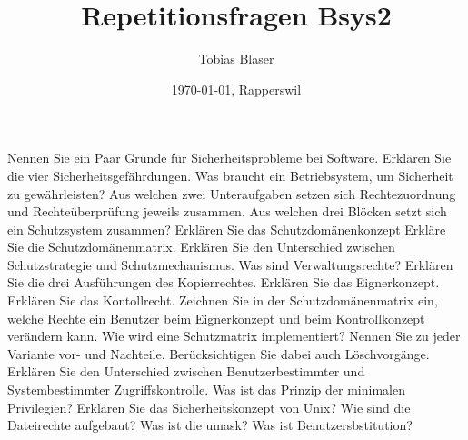 \documentclass[ngerman,a4paper,12pt]{scrreprt}
\title{Repetitionsfragen Bsys2}
\author{Tobias Blaser}
\date{\today{}, Rapperswil}
\begin{document}
\tableofcontents
\clearpage

\ol
	\li Nennen Sie ein Paar Gründe für Sicherheitsprobleme bei Software.
	\li Erklären Sie die vier Sicherheitsgefährdungen.
	\li Was braucht ein Betriebsystem, um Sicherheit zu gewährleisten?
	\li Aus welchen zwei Unteraufgaben setzen sich Rechtezuordnung und Rechteüberprüfung jeweils zusammen.
	\li Aus welchen drei Blöcken setzt sich ein Schutzsystem zusammen?
	\li Erklären Sie das Schutzdomänenkonzept
	\li Erkläre Sie die Schutzdomänenmatrix.
	\li Erklären Sie den Unterschied zwischen Schutzstrategie und Schutzmechanismus.
	\li Was sind Verwaltungsrechte?
	\li Erklären Sie die drei Ausführungen des Kopierrechtes.
	\li Erklären Sie das Eignerkonzept.
	\li Erklären Sie das Kontollrecht.
	\li Zeichnen Sie in der Schutzdomänenmatrix ein, welche Rechte ein Benutzer beim Eignerkonzept und beim Kontrollkonzept verändern kann.
	\li Wie wird eine Schutzmatrix implementiert? Nennen Sie zu jeder Variante vor- und Nachteile. Berücksichtigen Sie dabei auch Löschvorgänge.
	\li Erklären Sie den Unterschied zwischen Benutzerbestimmter und Systembestimmter Zugriffskontrolle.
	\li Was ist das Prinzip der minimalen Privilegien?
	\li Erklären Sie das Sicherheitskonzept von Unix? Wie sind die Dateirechte aufgebaut?
	\li Was ist die umask?
	\li Was ist Benutzersbstitution?
\olS
\end{document}

